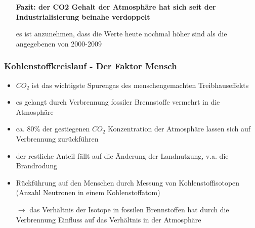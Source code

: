 \begin{frame}
{\begin{itemize}
			\item[] \textbf{Fazit: der CO2 Gehalt der Atmosphäre hat sich seit der Industrialisierung beinahe verdoppelt}
			\item[] es ist anzunehmen, dass die Werte heute nochmal höher sind als die angegebenen von 2000-2009
		\end{itemize}	
	}
\end{frame}

\begin{frame}
	\frametitle{Kohlenstoffkreislauf - Der Faktor Mensch}
	\begin{itemize}
		\item $CO_2$ ist das wichtigste Spurengas des menschengemachten Treibhauseffekts
		\item es gelangt durch Verbrennung fossiler Brennstoffe vermehrt in die Atmosphäre
		\item ca. 80\% der gestiegenen $CO_2$ Konzentration der Atmosphäre lassen sich auf Verbrennung zurückführen
		\item der restliche Anteil fällt auf die Änderung der Landnutzung, v.a. die Brandrodung
		\item Rückführung auf den Menschen durch Messung von Kohlenstoffisotopen (Anzahl Neutronen in einem Kohlenstoffatom)
		\item [$\rightarrow$] das Verhältnis der Isotope in fossilen Brennstoffen hat durch die Verbrennung Einfluss auf das Verhältnis in der Atmosphäre
	\end{itemize}

\end{frame}


